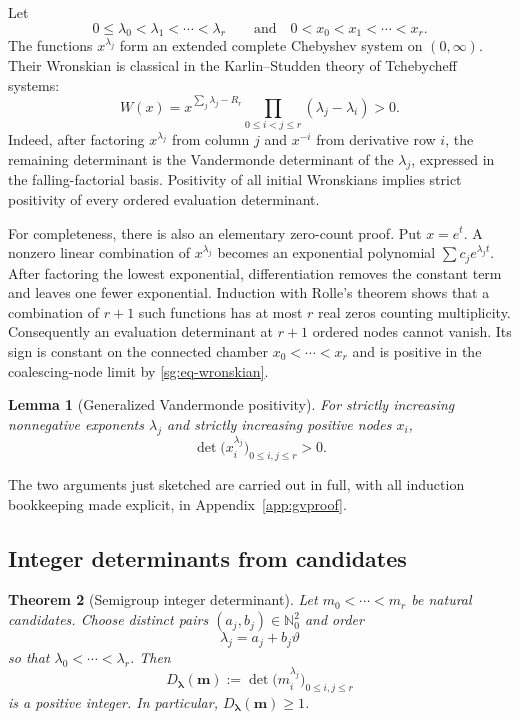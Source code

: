 \documentclass[11pt,oneside]{article}
\newtheorem{theorem}{Theorem}[section]
\newtheorem{lemma}[theorem]{Lemma}
\theoremstyle{definition}
\theoremstyle{remark}
\newcommand{\Nzero}{\mathbb N_0}
\newcommand{\thetaq}{\vartheta}
\begin{document}
Let
\[
 0\le\lambda_0<\lambda_1<\cdots<\lambda_r
\qquad\text{and}\quad
 0<x_0<x_1<\cdots<x_r.
\]
The functions $x^{\lambda_j}$ form an extended complete Chebyshev system on $(0,\infty)$.
Their Wronskian is classical in the Karlin--Studden theory of Tchebycheff systems:
\begin{equation}
 W(x)
 =x^{\sum_j\lambda_j-R_r}
   \prod_{0\le i<j\le r}(\lambda_j-\lambda_i)>0.
 \label{sg:eq-wronskian}
\end{equation}
Indeed, after factoring $x^{\lambda_j}$ from column $j$ and $x^{-i}$ from derivative row
$i$, the remaining determinant is the Vandermonde determinant of the $\lambda_j$, expressed
in the falling-factorial basis.  Positivity of all initial Wronskians implies strict positivity
of every ordered evaluation determinant.

For completeness, there is also an elementary zero-count proof.  Put $x=e^t$.  A nonzero
linear combination of $x^{\lambda_j}$ becomes an exponential polynomial
$\sum c_je^{\lambda_jt}$.  After factoring the lowest exponential, differentiation removes
the constant term and leaves one fewer exponential.  Induction with Rolle's theorem shows
that a combination of $r+1$ such functions has at most $r$ real zeros counting multiplicity.
Consequently an evaluation determinant at $r+1$ ordered nodes cannot vanish.  Its sign is
constant on the connected chamber $x_0<\cdots<x_r$ and is positive in the coalescing-node
limit by \eqref{sg:eq-wronskian}.

\begin{lemma}[Generalized Vandermonde positivity]
\label{sg:lem-generalized-vandermonde}
For strictly increasing nonnegative exponents $\lambda_j$ and strictly increasing positive
nodes $x_i$,
\begin{equation}
 \det\bigl(x_i^{\lambda_j}\bigr)_{0\le i,j\le r}>0.
 \label{sg:eq-gv-positive}
\end{equation}
\end{lemma}

The two arguments just sketched are carried out in full, with all induction bookkeeping made
explicit, in Appendix~\ref{app:gvproof}.

\subsection{Integer determinants from candidates}

\begin{theorem}[Semigroup integer determinant]
\label{sg:thm-semigroup-integer-det}
Let $m_0<\cdots<m_r$ be natural candidates.  Choose distinct pairs
$(a_j,b_j)\in\Nzero^2$ and order
\[
 \lambda_j=a_j+b_j\thetaq
\]
so that $\lambda_0<\cdots<\lambda_r$.  Then
\begin{equation}
 D_{\boldsymbol\lambda}(\boldsymbol m)
 :=\det\bigl(m_i^{\lambda_j}\bigr)_{0\le i,j\le r}
 \label{sg:eq-semigroup-det}
\end{equation}
is a positive integer.  In particular, $D_{\boldsymbol\lambda}(\boldsymbol m)\ge1$.
\end{theorem}
\end{document}
